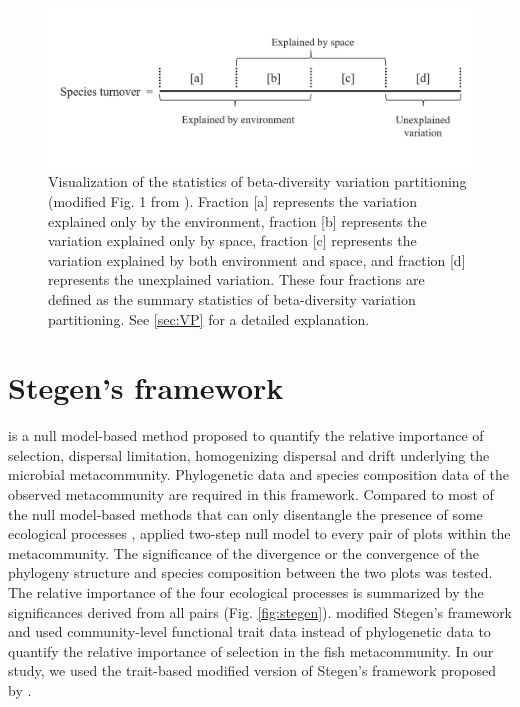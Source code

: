 \begin{figure}
	\centering
	\includegraphics[width=\linewidth]{./figures/ppt/VP.png}
	\caption[Visualization of the statistics of beta-diversity variation partitioning.]{\small
		Visualization of the statistics of beta-diversity variation partitioning (modified Fig. 1 from \citealp{peres2006variation}). Fraction [a] represents the variation explained only by the environment, fraction [b] represents the variation explained only by space, fraction [c] represents the variation explained by both environment and space, and fraction [d] represents the unexplained variation. These four fractions are defined as the summary statistics of beta-diversity variation partitioning. See \autoref{sec:VP} for a detailed explanation.}
	\label{fig:VP}
\end{figure}

\section{Stegen's framework}
\noindent
\label{sec:Stegen}
\citet{stegen2013quantifying} is a null model-based method proposed to quantify the relative importance of selection, dispersal limitation, homogenizing dispersal and drift underlying the microbial metacommunity. Phylogenetic data and species composition data of the observed metacommunity are required in this framework. Compared to most of the null model-based methods that can only disentangle the presence of some ecological processes \citep{ulrich2010null, chase2011disentangling}, \citet{stegen2013quantifying} applied two-step null model to every pair of \DIFdelbegin {}\DIFdelend plots within the metacommunity. The significance of the divergence or the convergence of the phylogeny structure and species composition between the two plots was tested. The relative importance of the four ecological processes is summarized by the significances derived from all pairs (Fig. \ref{fig:stegen}). \citet{ford2020functional} modified Stegen's framework and used community-level functional trait data instead of phylogenetic data to quantify the relative importance of selection in the fish metacommunity. In our study, we used the trait-based modified version of Stegen's framework proposed by \citet{ford2020functional}.

